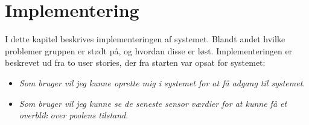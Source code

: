 \chapter{Implementering}

I dette kapitel beskrives implementeringen af systemet. Blandt andet hvilke problemer gruppen er stødt på, og hvordan disse er løst. 
Implementeringen er beskrevet ud fra to user stories, der fra starten var opsat for systemet:

\begin{itemize}
	\item \textit{Som bruger vil jeg kunne oprette mig i systemet for at få adgang til systemet}.
	\item \textit{Som bruger vil jeg kunne se de seneste sensor værdier for at kunne få et overblik over poolens tilstand}.
\end{itemize}




